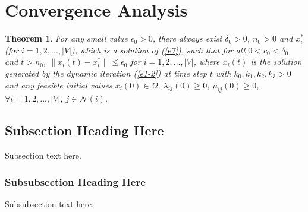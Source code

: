 \documentclass[journal]{IEEEtran}
\newtheorem{theorem}{Theorem}
\begin{document}
\section{Convergence Analysis}

\begin{theorem}
For any small value $\epsilon_0>0$, there always exist $\delta_0>0$, $n_0>0$ and $x_i^*$ (for $i=1,2,...,|V|$), which is a solution of (\ref{e7}), such that for all $0<c_0<\delta_0$ and $t>n_0$,  $\|x_i(t)-x_i^*\|\leq \epsilon_0$ for $i=1,2,...,|V|$, where $x_i(t)$ is the solution generated by the dynamic iteration (\ref{e1-2}) at time step $t$ with $k_0, k_1, k_2, k_3>0$ and any feasible initial values $x_i(0)\in \Omega$, $\lambda_{ij}(0)\geq 0$, $\mu_{ij}(0)\geq 0$, $\forall i=1,2,..., |V|$, $j\in\mathcal{N}(i)$.
\end{theorem}
%


\subsection{Subsection Heading Here}
Subsection text here.


\subsubsection{Subsubsection Heading Here}
Subsubsection text here.


%
%
\end{document}
